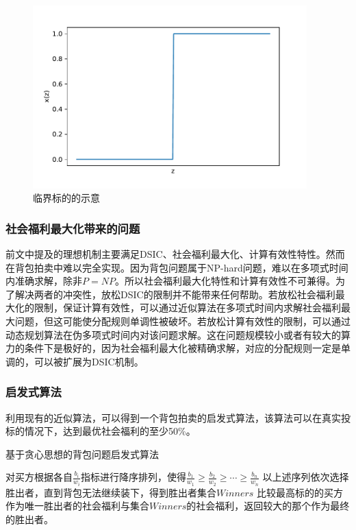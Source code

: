\documentclass[promaster]{thesis-uestc}
\begin{document}
\begin{figure}[h]
    \includegraphics[width=300pt]{pic/jieyuefenpei.pdf}
    \caption{临界标的的示意}
    \label{criticalbid}
\end{figure}

\subsubsection{社会福利最大化带来的问题}
前文中提及的理想机制主要满足DSIC、社会福利最大化、计算有效性特性。然而在背包拍卖中难以完全实现。因为背包问题属于NP-hard问题，难以在多项式时间内准确求解，除非$P=NP$。所以社会福利最大化特性和计算有效性不可兼得。为了解决两者的冲突性，放松DSIC的限制并不能带来任何帮助。若放松社会福利最大化的限制，保证计算有效性，可以通过近似算法在多项式时间内求解社会福利最大问题，但这可能使分配规则单调性被破坏。若放松计算有效性的限制，可以通过动态规划算法在伪多项式时间内对该问题求解。这在问题规模较小或者有较大的算力的条件下是极好的，因为社会福利最大化被精确求解，对应的分配规则一定是单调的，可以被扩展为DSIC机制。

\subsubsection{启发式算法}
利用现有的近似算法，可以得到一个背包拍卖的启发式算法，该算法可以在真实投标的情况下，达到最优社会福利的至少50\%。

\begin{algorithm}[H]
\caption{基于贪心思想的背包问题启发式算法}
对买方根据各自$\frac{b_i}{w_i}$指标进行降序排列，使得$\frac{b_1}{w_1}\geq\frac{b_2}{w_2}\geq \cdots \geq \frac{b_n}{w_n}$\;
以上述序列依次选择胜出者，直到背包无法继续装下，得到胜出者集合$Winners$\;
比较最高标的的买方作为唯一胜出者的社会福利与集合$Winners$的社会福利，返回较大的那个作为最终的胜出者。\;
\end{algorithm}
\end{document}
